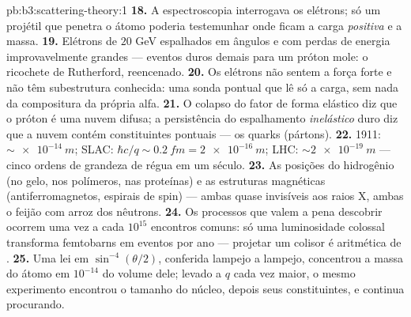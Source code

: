 \begin{solution}{pb:b3:scattering-theory:1}
\textbf{18.} A espectroscopia interrogava os elétrons; só um projétil
que penetra o átomo poderia testemunhar onde ficam a carga
\emph{positiva} e a massa.
\textbf{19.} Elétrons de $20$ GeV espalhados em ângulos e com perdas de
energia improvavelmente grandes --- eventos duros demais para um próton
mole: o ricochete de Rutherford, reencenado.
\textbf{20.} Os elétrons não sentem a força forte e não têm
subestrutura conhecida: uma sonda pontual que lê só a carga, sem nada
da compositura da própria alfa.
\textbf{21.} O colapso do fator de forma elástico diz que o próton é
uma nuvem difusa; a persistência do espalhamento \emph{inelástico} duro
diz que a nuvem contém constituintes pontuais --- os quarks (pártons).
\textbf{22.} 1911: $\sim\qty{e-14}{m}$; SLAC: $\hbar c/q \sim
\qty{0.2}{fm} = \qty{2e-16}{m}$; LHC: $\sim\qty{2e-19}{m}$ --- cinco
ordens de grandeza de régua em um século.
\textbf{23.} As posições do hidrogênio (no gelo, nos polímeros, nas
proteínas) e as estruturas magnéticas (antiferromagnetos, espirais de
spin) --- ambas quase invisíveis aos raios X, ambas o feijão com arroz
dos nêutrons.
\textbf{24.} Os processos que valem a pena descobrir ocorrem uma vez a
cada $10^{15}$ encontros comuns: só uma luminosidade colossal
transforma femtobarns em eventos por ano --- projetar um colisor é
aritmética de .
\textbf{25.} Uma lei em $\sin^{-4}(\theta/2)$, conferida lampejo a
lampejo, concentrou a massa do átomo em $10^{-14}$ do volume dele;
levado a $q$ cada vez maior, o mesmo experimento encontrou o tamanho do
núcleo, depois seus constituintes, e continua procurando.
\end{solution}
